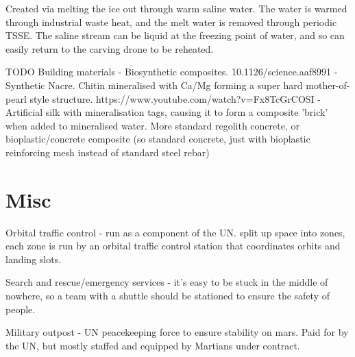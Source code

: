 \documentclass[10pt]{article}
\begin{document}
Created via melting the ice out through warm saline water. The water is warmed through industrial waste heat, and the melt water is removed through periodic TSSE. The saline stream can be liquid at the freezing point of water, and so can easily return to the carving drone to be reheated.


TODO Building materials - Biosynthetic composites. 
10.1126/science.aaf8991 - Synthetic Nacre. Chitin mineralised with Ca/Mg forming a super hard mother-of-pearl style structure.
https://www.youtube.com/watch?v=Fx8TcGrCOSI - Artificial silk with mineralisation tags, causing it to form a composite 'brick' when added to mineralised water.
More standard regolith concrete, or bioplastic/concrete composite (so standard concrete, just with bioplastic reinforcing mesh instead of standard steel rebar)

\section{Misc}
Orbital traffic control - run as a component of the UN. split up space into zones, each zone is run by an orbital traffic control station that coordinates orbits and landing slots.

Search and rescue/emergency services - it's easy to be stuck in the middle of nowhere, so a team with a shuttle should be stationed to ensure the safety of people.

Military outpost - UN peacekeeping force to ensure stability on mars. Paid for by the UN, but mostly staffed and equipped by Martians under contract.



\end{document}
